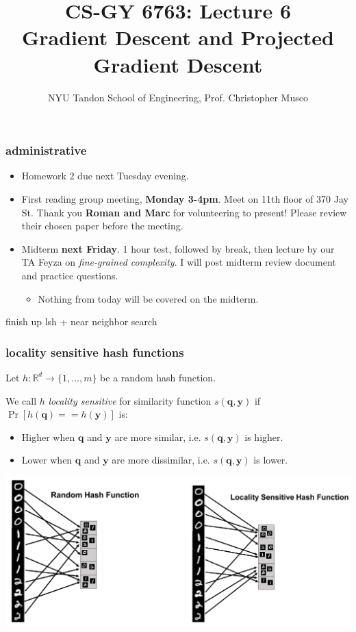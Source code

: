 \documentclass[compress]{beamer}
\title{CS-GY 6763: Lecture 6 \\ Gradient Descent and Projected Gradient Descent}
\author{NYU Tandon School of Engineering, Prof. Christopher Musco}
\date{}
\newcommand{\bv}[1]{\mathbf{#1}}
\newcommand{\R}{\mathbb{R}}
\begin{document}
\begin{frame}
	\titlepage 
\end{frame}


\begin{frame}
	\frametitle{administrative}
	\begin{itemize}
		\item Homework 2 due next Tuesday evening. 
		\item First reading group meeting, \textbf{Monday 3-4pm}. Meet on 11th floor of 370 Jay St. Thank you \textbf{Roman and Marc} for volunteering to present! Please review their chosen paper before the meeting.
		\item Midterm \textbf{next Friday}. 1 hour test, followed by break, then lecture by our TA Feyza on \emph{fine-grained complexity}. I will post midterm review document and practice questions. 
		\begin{itemize}
			\item Nothing from today will be covered on the midterm. 
		\end{itemize}
	\end{itemize}
\end{frame}

\begin{frame}[standout]
	\begin{center}
		finish up lsh + near neighbor search
	\end{center}
\end{frame}

\begin{frame}
	\frametitle{locality sensitive hash functions}
	Let $h: \R^d \rightarrow \{1, \ldots, m\}$ be a random hash function. 
	
	We call $h$ \emph{locality sensitive} for similarity function $s(\bv{q},\bv{y})$ if $\Pr\left[h(\bv{q}) == h(\bv{y})\right]$ is:
	\begin{itemize}
		\item Higher when $\bv{q}$ and $\bv{y}$ are more similar, i.e. $s(\bv{q},\bv{y})$ is higher.
		\item Lower when $\bv{q}$ and $\bv{y}$ are more dissimilar, i.e. $s(\bv{q},\bv{y})$ is lower. 
	\end{itemize}
\begin{center}
	\includegraphics[width=.9\textwidth]{cam_lsh.png}
\end{center}
\end{frame}
\end{document}
